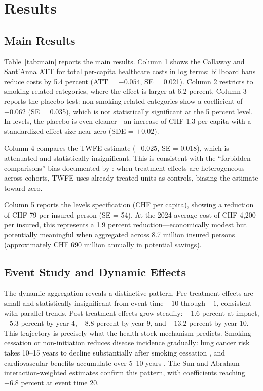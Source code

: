 \documentclass[12pt]{article}
\begin{document}
\section{Results}

\subsection{Main Results}



Table~\ref{tab:main} reports the main results. Column 1 shows the Callaway and Sant'Anna ATT for total per-capita healthcare costs in log terms: billboard bans reduce costs by 5.4 percent (ATT = $-0.054$, SE = 0.021). Column 2 restricts to smoking-related categories, where the effect is larger at 6.2 percent. Column 3 reports the placebo test: non-smoking-related categories show a coefficient of $-0.062$ (SE = 0.035), which is not statistically significant at the 5 percent level. In levels, the placebo is even cleaner---an increase of CHF 1.3 per capita with a standardized effect size near zero (SDE = $+0.02$).

Column 4 compares the TWFE estimate ($-0.025$, SE = 0.018), which is attenuated and statistically insignificant. This is consistent with the ``forbidden comparisons'' bias documented by \citet{goodman2021difference}: when treatment effects are heterogeneous across cohorts, TWFE uses already-treated units as controls, biasing the estimate toward zero.

Column 5 reports the levels specification (CHF per capita), showing a reduction of CHF 79 per insured person (SE = 54). At the 2024 average cost of CHF 4,200 per insured, this represents a 1.9 percent reduction---economically modest but potentially meaningful when aggregated across 8.7 million insured persons (approximately CHF 690 million annually in potential savings).

\subsection{Event Study and Dynamic Effects}

The dynamic aggregation reveals a distinctive pattern. Pre-treatment effects are small and statistically insignificant from event time $-10$ through $-1$, consistent with parallel trends. Post-treatment effects grow steadily: $-1.6$ percent at impact, $-5.3$ percent by year 4, $-8.8$ percent by year 9, and $-13.2$ percent by year 10. This trajectory is precisely what the health-stock mechanism predicts. Smoking cessation or non-initiation reduces disease incidence gradually: lung cancer risk takes 10--15 years to decline substantially after smoking cessation \citep{peto2000smoking}, and cardiovascular benefits accumulate over 5--10 years \citep{jha2006avoidable}. The Sun and Abraham interaction-weighted estimates confirm this pattern, with coefficients reaching $-6.8$ percent at event time 20.
\end{document}
